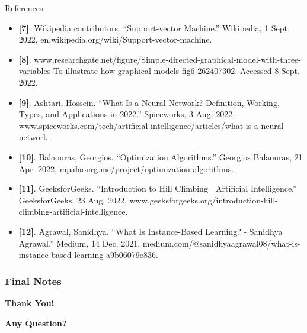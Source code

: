 \documentclass[compress,oilve]{beamer}
\begin{document}
\begin{frame}{References}
\begin{itemize}
\item{} \textbf{[7]}. Wikipedia contributors. “Support-vector Machine.” Wikipedia, 1 Sept. 2022, en.wikipedia.org/wiki/Support-vector-machine.
\item{} \textbf{[8]}. www.researchgate.net/figure/Simple-directed-graphical-model-with-three-variables-To-illustrate-how-graphical-models-fig6-262407302. Accessed 8 Sept. 2022.
\item{} \textbf{[9]}. Ashtari, Hossein. “What Is a Neural Network? Definition, Working, Types, and Applications in 2022.” Spiceworks, 3 Aug. 2022, www.spiceworks.com/tech/artificial-intelligence/articles/what-is-a-neural-network.
\item{} \textbf{[10]}. Balaouras, Georgios. “Optimization Algorithms.” Georgios Balaouras, 21 Apr. 2022, mpalaourg.me/project/optimization-algorithms.
\item{} \textbf{[11]}. GeeksforGeeks. “Introduction to Hill Climbing | Artificial Intelligence.” GeeksforGeeks, 23 Aug. 2022, www.geeksforgeeks.org/introduction-hill-climbing-artificial-intelligence.
\item{} \textbf{[12]}. Agrawal, Sanidhya. “What Is Instance-Based Learning? - Sanidhya Agrawal.” Medium, 14 Dec. 2021, medium.com/@sanidhyaagrawal08/what-is-instance-based-learning-a9b06079e836.
\end{itemize}
\end{frame}


\frametitle{Final Notes}
\centering
\vspace{50 pt}
\textbf{Thank You!}
\vspace{50pt}

\textbf{Any Question?}
\end{document}

